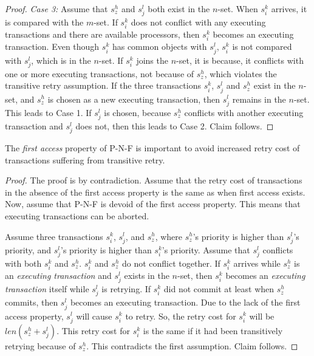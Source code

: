 \begin{proof}
\textit{Case 3:} Assume that $s_{z}^{h}$ and $s_{j}^{l}$ both exist in the $n$-set.
When $s_{i}^{k}$ arrives, it is compared with the $m$-set. If $s_{i}^{k}$ does not conflict with any executing transactions and there are available processors, then $s_{i}^{k}$ becomes an executing transaction. 
Even though $s_{i}^{k}$ has common objects with $s_{j}^{l}$, $s_{i}^{k}$ is not compared with $s_{j}^{l}$, which is in the $n$-set. If $s_{i}^{k}$ joins the $n$-set, it is because, it conflicts with one or more executing transactions, not because of $s_{z}^{h}$, which violates the transitive retry assumption.
If the three transactions $s_i^k$, $s_j^l$ and $s_z^h$ exist in the $n$-set, and  $s_{z}^{h}$ is chosen as a new executing transaction, then $s_{j}^{l}$ remains in the $n$-set. This leads to
Case 1. If $s_{j}^{l}$ is chosen, because $s_{z}^{h}$ conflicts
with another executing transaction and $s_{j}^{l}$ does not, then
this leads to Case 2. Claim follows.
%
\end{proof}


\begin{clm}\label{first-access}
The \emph{first access} property of P-N-F is important
to avoid increased retry cost of transactions suffering from transitive
retry.
\end{clm}
\begin{proof}
The proof is by contradiction. Assume that the retry cost of transactions
in the absence of the first access property is the same as when first access  exists. Now, assume that P-N-F is devoid of the first access property.  This means that executing transactions can be aborted. 

Assume three transactions $s_{i}^{k}$, $s_{j}^{l}$, and $s_{z}^{h}$, where $s_{z}^{h}$'s priority is higher than $s_{j}^{l}$'s priority, and $s_j^l$'s priority is higher than $s_{i}^{k}$'s priority. Assume that $s_{j}^{l}$ conflicts with both $s_{i}^{k}$ and $s_{z}^{h}$. 
$s_{i}^{k}$ and $s_{z}^{h}$ do not conflict together. If $s_{i}^{k}$
arrives while $s_{z}^{h}$ is an \emph{executing transaction} and $s_{j}^{l}$
exists in the $n$-set, then $s_{i}^{k}$ becomes an \emph{executing transaction} itself while $s_{j}^{l}$ is retrying. If $s_{i}^{k}$ did not commit at least when $s_{z}^{h}$ commits, then $s_{j}^{l}$ becomes an executing transaction. 
Due to the lack of the first access property, $s_{j}^{l}$ will cause $s_{i}^{k}$ to retry. So, the retry cost for $s_{i}^{k}$ will be $len(s_{z}^{h}+s_{j}^{l})$. This
retry cost for $s_{i}^{k}$ is the same if it had been transitively
retrying because of $s_{z}^{h}$. 
This contradicts the first
assumption. Claim follows.
\end{proof}

